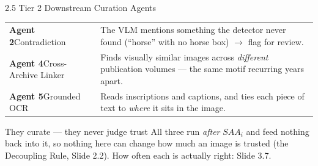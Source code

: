 \documentclass[aspectratio=169,11pt]{beamer}
\begin{document}
\begin{frame}{2.5 Tier 2 Downstream Curation Agents}
\scriptsize
\begin{center}
\begin{tabular}{@{}p{2.4cm} p{9.6cm}@{}}
\toprule
\textbf{Agent 2}\newline Contradiction & The VLM mentions something the detector never found (``horse'' with no horse box) $\rightarrow$ flag for review. \\
\addlinespace
\textbf{Agent 4}\newline Cross-Archive Linker & Finds visually similar images across \emph{different} publication volumes --- the same motif recurring years apart. \\
\addlinespace
\textbf{Agent 5}\newline Grounded OCR & Reads inscriptions and captions, and ties each piece of text to \emph{where} it sits in the image. \\
\bottomrule
\end{tabular}
\end{center}
\vspace{1mm}
\begin{alertblock}{\scriptsize They curate --- they never judge trust}
\scriptsize All three run \emph{after} $SAA_i$ and feed nothing back into it, so nothing here can change how much an image is trusted (the Decoupling Rule, Slide 2.2). How often each is actually right: Slide 3.7.
\end{alertblock}
\end{frame}
\end{document}
